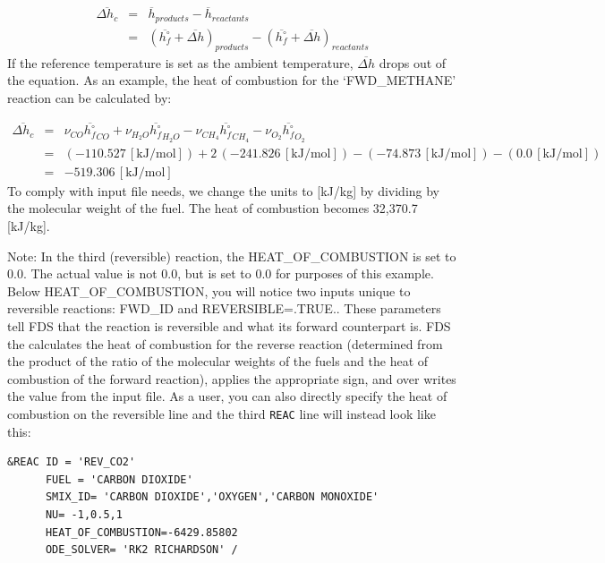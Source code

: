 \documentclass[11pt]{book}
\newcommand{\ct}{\tt\small}
\begin{document}
\begin{eqnarray}
\overline{\Delta h_c} &=& \overline{h}_{products} - \overline{h}_{reactants} \\
\nonumber &=& (\overline{h_f^{\circ}}+\overline{\Delta h})_{products} - (\overline{h_f^{\circ}}+\overline{\Delta h})_{reactants}
\end{eqnarray}
If the reference temperature is set as the ambient temperature, $\overline{\Delta h}$ drops out of the equation. As an example, the heat of combustion for the `FWD\_METHANE' reaction can be calculated by:

\begin{eqnarray}
\overline{\Delta h_c} &=& \nu_{CO}\overline{h_f^{\circ}}_{CO}+\nu_{H_2O}\overline{h_f^{\circ}}_{H_2O} - \nu_{CH_4}\overline{h_f^{\circ}}_{CH_4}-\nu_{O_2}\overline{h_f^{\circ}}_{O_2} \\
\nonumber &=& (-110.527 \,[\mathrm{kJ/mol}])+2\,(-241.826 \,[\mathrm{kJ/mol}])-(-74.873 \,[\mathrm{kJ/mol}])-(0.0 \,[\mathrm{kJ/mol}]) \\
\nonumber &=& -519.306 \,[\mathrm{kJ/mol}]
\end{eqnarray}
To comply with input file needs, we change the units to [{kJ}/{kg}] by dividing by the molecular weight of the fuel. The heat of combustion becomes 32,370.7 [{kJ}/{kg}].

Note: In the third (reversible) reaction, the HEAT\_OF\_COMBUSTION is set to 0.0. The actual value is not 0.0, but is set to 0.0 for purposes of this example. Below HEAT\_OF\_COMBUSTION, you will notice two inputs unique to reversible reactions: FWD\_ID and REVERSIBLE=.TRUE.. These parameters tell FDS that the reaction is reversible and what its forward counterpart is. FDS the calculates the heat of combustion for the reverse reaction (determined from the product of the ratio of the molecular weights of the fuels and the heat of combustion of the forward reaction), applies the appropriate sign, and over writes the value from the input file. As a user, you can also directly specify the heat of combustion on the reversible line and the third {\ct REAC} line will instead look like this:

\footnotesize
\begin{verbatim}
&REAC ID = 'REV_CO2'
      FUEL = 'CARBON DIOXIDE'
      SMIX_ID= 'CARBON DIOXIDE','OXYGEN','CARBON MONOXIDE'
      NU= -1,0.5,1
      HEAT_OF_COMBUSTION=-6429.85802
      ODE_SOLVER= 'RK2 RICHARDSON' /
\end{verbatim} \normalsize

\newpage
\end{document}
